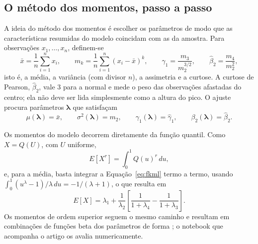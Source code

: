 \subsection{O método dos momentos, passo a passo}

A ideia do método dos momentos é escolher os parâmetros de modo que as características resumidas do modelo coincidam com as da amostra. Para observações $x_1, \ldots, x_n$, definem-se
\begin{equation}
    \bar x = \frac{1}{n}\sum_{i=1}^{n} x_i, \qquad
    m_k = \frac{1}{n}\sum_{i=1}^{n} (x_i - \bar x)^k, \qquad
    \widehat\gamma_1 = \frac{m_3}{m_2^{3/2}}, \qquad
    \widehat\beta_2 = \frac{m_4}{m_2^{2}},
    \label{eq:momentos_amostra}
\end{equation}
isto é, a média, a variância (com divisor $n$), a assimetria e a curtose. A curtose de Pearson, $\widehat\beta_2$, vale $3$ para a normal e mede o peso das observações afastadas do centro; ela não deve ser lida simplesmente como a altura do pico. O ajuste procura parâmetros $\boldsymbol\lambda$ que satisfaçam
\begin{equation}
    \mu(\boldsymbol\lambda) = \bar x, \qquad
    \sigma^2(\boldsymbol\lambda) = m_2, \qquad
    \gamma_1(\boldsymbol\lambda) = \widehat\gamma_1, \qquad
    \beta_2(\boldsymbol\lambda) = \widehat\beta_2.
    \label{eq:sistema}
\end{equation}

Os momentos do modelo decorrem diretamente da função quantil. Como $X = Q(U)$, com $U$ uniforme,
\begin{equation}
    E[X^r] = \int_0^1 Q(u)^r \, du,
\end{equation}
e, para a média, basta integrar a Equação~\eqref{eq:fkml} termo a termo, usando $\int_0^1 (u^{\lambda} - 1)/\lambda \, du = -1/(\lambda + 1)$, o que resulta em
\begin{equation}
    E[X] = \lambda_1 + \frac{1}{\lambda_2}
    \left[\frac{1}{1 + \lambda_4} - \frac{1}{1 + \lambda_3}\right].
    \label{eq:media}
\end{equation}
Os momentos de ordem superior seguem o mesmo caminho e resultam em combinações de funções beta dos parâmetros de forma \parencite{freimer1988}; o notebook que acompanha o artigo os avalia numericamente.

